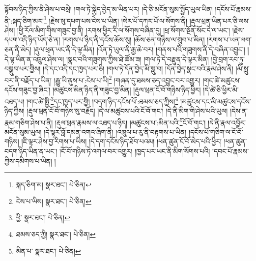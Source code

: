 སྟོབས་ཉིད་ཀྱིས་ནི་ཤེས་པ་བསྲེ། །གལ་ཏེ་སྐྱེད་བྱེད་མ་ཡིན་པར། །དེ་ཅི་མངོན་སུམ་སྤྱོད་ཡུལ་ཡིན། །དངོས་པོ་རྣམས་ནི་:སྐད་ཅིག་མར།\footnote{སྐད་ཅིག་མ།  སྣར་ཐང་།  པེ་ཅིན། } །རྗེས་སུ་དཔག་པས་ངེས་པ་ཡིན། །སེར་པོ་དཀར་པོ་ལ་སོགས་ནི། །རྡུལ་ཕྲན་ཡིན་པར་ཅི་ལས་ཤེས། །ཕྱི་རོལ་མིག་གིས་གཟུང་བྱ་ནི། །རགས་ཕྱིར་རི་ལ་སོགས་བཞིན་དུ། །ཕྲ་སོགས་སྔོན་སོང་དེ་ལ་ཡང་། །རྗེས་དཔག་འདི་ཉིད་ཡོད་ཅེ་ན། །རགས་པ་ཉིད་ནི་དངོས་ཆོས་སུ། །ཆོས་ཅན་གཉིས་ལ་གྲུབ་པ་མིན། །རགས་པ་ཡན་ལག་ཅན་ནི་མེད། །རྡུལ་ཕྲན་ཡང་ནི་དེ་ལྟ་མིན། །འོན་ཏེ་ཡུལ་ནི་རྒྱ་ཆེ་བར། །གནས་པའི་གཟུགས་ནི་དེ་བཞིན་འབྱུང་། །དེ་ལྟ་ཡིན་ན་འཁྲུལ་ཤེས་ལ། །སྣང་བའི་གཟུགས་ཀྱིས་ཐེ་ཚོམ་ཟ། །གལ་ཏེ་དེ་བརྫུན་དེ་ལྟར་མིན། །བྱེ་བྲག་རབ་ཏུ་བསྒྲུབ་པར་གྱིས། །དེ་དང་འདི་དང་ཁྱད་པར་ཅི། །གལ་ཏེ་དོན་བྱེད་མི་སླུ་བ། །དོན་བྱེད་སྣང་བའི་རྣམ་ཤེས་ནི། །མི་སླུ་བར་ནི་བརྗོད་པ་ཡིན། །རྒྱུ་ཡི་ནུས་པ་:ངེས་པ་ཡི།\footnote{ངེས་པ་ཡིས།  སྣར་ཐང་།  པེ་ཅིན། } །གཞན་དུ་ཐམས་ཅད་འབྱུང་བར་འགྱུར། །གང་ཚེ་མཚུངས་དངོས་གཟུང་བྱ་ཞིང་། །མཚུངས་མིན་ཉིད་ནི་གཟུང་བྱ་མིན། །རྡུལ་ཕྲན་ངོ་བོ་གཉིས་ཉིད་ཕྱིར། །དེ་ཚེ་ཅི་ཕྱིར་མི་འཐད་པ། །གང་ཚེ་སྤྱི་\footnote{ཕྱི་  སྣར་ཐང་།  པེ་ཅིན། }དང་ཁྱད་པར་གྱི། །བདག་ཉིད་དངོས་པོ་:ཐམས་ཅད་ཀྱིས།\footnote{ཐམས་ཅད་ཀྱི།  སྣར་ཐང་།  པེ་ཅིན། } །མཚུངས་དང་མི་མཚུངས་དངོས་ཉིད་ཀྱིས། །རྡུལ་ཕྲན་ངོ་བོ་གཉིས་སུ་བརྗོད། །དེ་ལ་མཚུངས་པའི་ངོ་བོ་གང་། །དེ་ནི་མིག་གི་ཤེས་པའི་ཡུལ། །དེས་ན་རྣམ་གཅིག་ཤེས་པ་ནི། །རྡུལ་ཕྲན་རྣམས་ལ་འཐད་པ་ཉིད། །མཚུངས་པ་:མིན་པའི་\footnote{མིན་པ་  སྣར་ཐང་།  པེ་ཅིན། }ངོ་བོ་གང་། །དེ་ནི་རྣལ་འབྱོར་མངོན་སུམ་ཡུལ། །དེ་ལྟར་བློ་དམན་འགའ་ཞིག་ནི། །འཁྲུལ་པ་རུ་ནི་བརྟགས་པ་ཡིན། །དངོས་པོ་གཅིག་ལ་ངོ་བོ་གཉིས། །ཇི་ལྟར་ཤེས་བྱ་རིགས་པ་ཡིས། །དེ་དག་དངོས་ཉིད་ཐོབ་པའམ། །ཕན་ཚུན་ངོ་བོ་མེད་པའི་ཕྱིར། །ཕན་ཚུན་བདག་ཉིད་ཡིན་ན་ཡང་། །ངོ་བོ་གཉིས་ཏེ་འགལ་བར་འགྱུར། །ཁྱད་པར་ཡང་ནི་མིག་སོགས་པའི། །དབང་པོ་རྣམས་ཀྱིས་དམིགས་པ་ཡིན། །
